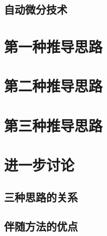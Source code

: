 \documentclass[a4paper,12pt]{article}
\begin{document}
\subsection{自动微分技术}

\section{第一种推导思路}

\section{第二种推导思路}

\section{第三种推导思路}

\section{进一步讨论}

\subsection{三种思路的关系}

\subsection{伴随方法的优点}
\end{document}

